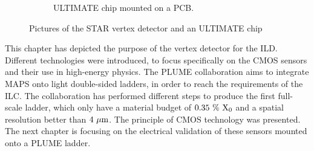 \begin{figure}[!tbh]
\begin{subfigure}[t]{0.4\textwidth}
        \caption{ULTIMATE chip mounted on a PCB. %
        }
        \label{fig:ultimate}
    \end{subfigure}
    \caption{Pictures of the STAR vertex detector and an ULTIMATE chip}\label{fig:Mi28}
    \end{figure}    

    This chapter has depicted the purpose of the vertex detector for the \gls{ILD}.
    Different technologies were introduced, to focus specifically on the \gls{CMOS} sensors and their use in high-energy physics.
    The \gls{PLUME} collaboration aims to integrate \gls{MAPS} onto light double-sided ladders, in order to reach the requirements of the \gls{ILC}.
    The collaboration has performed different steps to produce the first full-scale ladder, which only have a material budget of $0.35~\%~\rm{X_0}$ and a spatial resolution better than $4~\rm{\mu m}$.
    The principle of \gls{CMOS} technology was presented. 
    The next chapter is focusing on the electrical validation of these sensors mounted onto a PLUME ladder.

    


